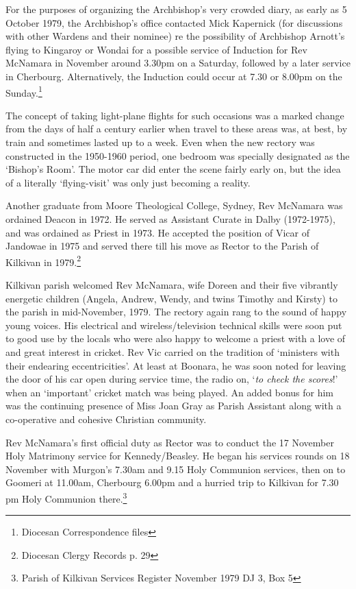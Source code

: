 For the purposes of organizing the Archbishop's very crowded diary, as
early as 5 October 1979, the Archbishop's office contacted Mick
Kapernick (for discussions with other Wardens and their nominee) re the
possibility of Archbishop Arnott's flying to Kingaroy or Wondai for a
possible service of Induction for Rev McNamara in November around 3.30pm
on a Saturday, followed by a later service in Cherbourg. Alternatively,
the Induction could occur at 7.30 or 8.00pm on the Sunday.\footnote{Diocesan
  Correspondence files}

The concept of taking light-plane flights for such occasions was a
marked change from the days of half a century earlier when travel to
these areas was, at best, by train and sometimes lasted up to a week.
Even when the new rectory was constructed in the 1950-1960 period, one
bedroom was specially designated as the `Bishop's Room'. The motor car
did enter the scene fairly early on, but the idea of a literally
`flying-visit' was only just becoming a reality.

Another graduate from Moore Theological College, Sydney, Rev McNamara
was ordained Deacon in 1972. He served as Assistant Curate in Dalby
(1972-1975), and was ordained as Priest in 1973. He accepted the
position of Vicar of Jandowae in 1975 and served there till his move as
Rector to the Parish of Kilkivan in 1979.\footnote{Diocesan Clergy
  Records p. 29}

Kilkivan parish welcomed Rev McNamara, wife Doreen and their five
vibrantly energetic children (Angela, Andrew, Wendy, and twins Timothy
and Kirsty) to the parish in mid-November, 1979. The rectory again rang
to the sound of happy young voices. His electrical and
wireless/television technical skills were soon put to good use by the
locals who were also happy to welcome a priest with a love of and great
interest in cricket. Rev Vic carried on the tradition of `ministers with
their endearing eccentricities'. At least at Boonara, he was soon noted
for leaving the door of his car open during service time, the radio on,
`\emph{to check the scores}!' when an `important' cricket match was
being played. An added bonus for him was the continuing presence of Miss
Joan Gray as Parish Assistant along with a co-operative and cohesive
Christian community.

Rev McNamara's first official duty as Rector was to conduct the 17
November Holy Matrimony service for Kennedy/Beasley. He began his
services rounds on 18 November with Murgon's 7.30am and 9.15 Holy
Communion services, then on to Goomeri at 11.00am, Cherbourg 6.00pm and
a hurried trip to Kilkivan for 7.30 pm Holy Communion there.\footnote{Parish
  of Kilkivan Services Register November 1979 DJ 3, Box 5}

